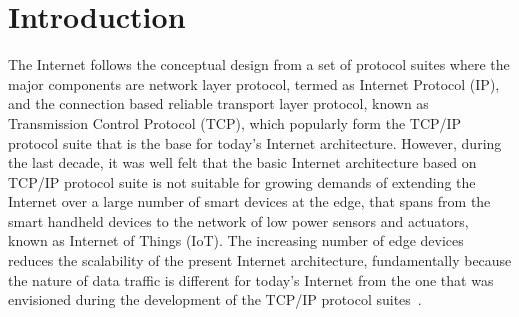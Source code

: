\section{Introduction}

The Internet follows the conceptual design from a set of protocol suites where the major components are network layer protocol, termed as Internet Protocol (IP), and the connection based reliable transport layer protocol, known as Transmission Control Protocol (TCP), which popularly form the TCP/IP protocol suite that is the base for today's Internet architecture. However, during the last decade, it was well felt that the basic Internet architecture based on TCP/IP protocol suite is not suitable for growing demands of extending the Internet over a large number of smart devices at the edge, that spans from the smart handheld devices to the network of low power sensors and actuators, known as Internet of Things (IoT). The increasing number of edge devices reduces the scalability of the present Internet architecture, fundamentally because the nature of data traffic is different for today's Internet from the one that was envisioned during the development of the TCP/IP protocol suites~\cite{rexford2010future,zhang2016smart}. 


